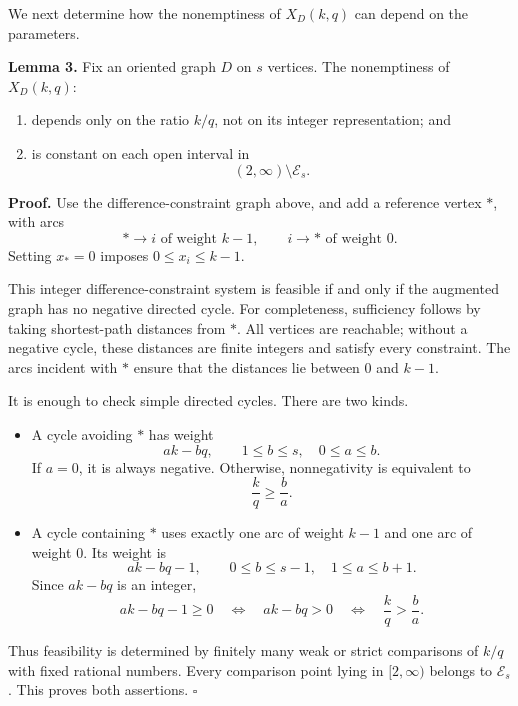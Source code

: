 \documentclass[
  11pt,
  a4paper,
]{article}
\newcounter{none} %
\providecommand{\tightlist}{%
  \setlength{\itemsep}{0pt}\setlength{\parskip}{0pt}}
\begin{document}
We next determine how the nonemptiness of \(X_D(k,q)\) can depend on the
parameters.

\textbf{Lemma 3.} Fix an oriented graph \(D\) on \(s\) vertices. The
nonemptiness of \(X_D(k,q)\):

\begin{enumerate}
\def\labelenumi{\arabic{enumi}.}
\tightlist
\item
  depends only on the ratio \(k/q\), not on its integer representation;
  and
\item
  is constant on each open interval in \[
  (2,\infty)\setminus\mathcal E_s.
  \]
\end{enumerate}

\textbf{Proof.} Use the difference-constraint graph above, and add a
reference vertex \(*\), with arcs \[
*\longrightarrow i \text{ of weight }k-1,
\qquad
i\longrightarrow * \text{ of weight }0.
\] Setting \(x_*=0\) imposes \(0\le x_i\le k-1\).

This integer difference-constraint system is feasible if and only if the
augmented graph has no negative directed cycle. For completeness,
sufficiency follows by taking shortest-path distances from \(*\). All
vertices are reachable; without a negative cycle, these distances are
finite integers and satisfy every constraint. The arcs incident with
\(*\) ensure that the distances lie between \(0\) and \(k-1\).

It is enough to check simple directed cycles. There are two kinds.

\begin{itemize}
\item
  A cycle avoiding \(*\) has weight \[
  ak-bq,\qquad 1\le b\le s,\quad 0\le a\le b.
  \] If \(a=0\), it is always negative. Otherwise, nonnegativity is
  equivalent to \[
  \frac{k}{q}\ge\frac ba.
  \]
\item
  A cycle containing \(*\) uses exactly one arc of weight \(k-1\) and
  one arc of weight \(0\). Its weight is \[
  ak-bq-1,\qquad 0\le b\le s-1,\quad 1\le a\le b+1.
  \] Since \(ak-bq\) is an integer, \[
  ak-bq-1\ge0
  \quad\Longleftrightarrow\quad
  ak-bq>0
  \quad\Longleftrightarrow\quad
  \frac{k}{q}>\frac ba.
  \]
\end{itemize}

Thus feasibility is determined by finitely many weak or strict
comparisons of \(k/q\) with fixed rational numbers. Every comparison
point lying in \([2,\infty)\) belongs to \(\mathcal E_s\). This proves
both assertions. \(\square\)
\end{document}
